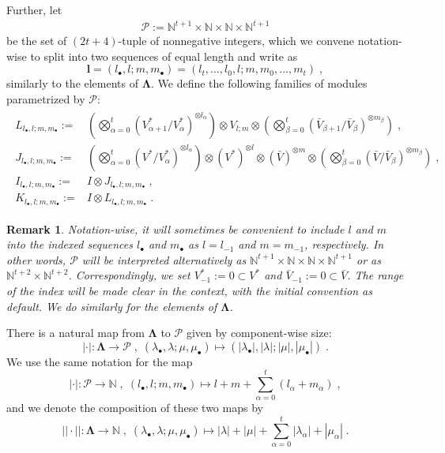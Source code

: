 \documentclass[12pt]{article}
\def\NN {{\mathbb N}}     %
\def\mc {\mathcal}
\newtheorem{rem}{Remark}[section]
\begin{document}
Further, let
\begin{gather}\label{For mcP}
\mc P := \NN^{t+1}\times \NN\times \NN\times\NN^{t+1}
\end{gather}
be the set of $(2t+4)$-tuple of nonnegative integers, which we convene notation-wise to split into two sequences of equal length and write as
$$
\bm l= (l_\bullet,l;m,m_\bullet)=(l_{t},...,l_0,l;m,m_0,...,m_{t}) \;,
$$
similarly to the elements of $\bm\Lambda$. We define the following families of modules parametrized by $\mc P$:
\begin{gather}\label{For LJITlm}
\begin{array}{rl}
L_{l_\bullet,l;m,m_\bullet} :=& \left(\bigotimes\limits_{\alpha=0}^t (V^*_{\alpha+1}/V^*_{\alpha})^{\otimes l_\alpha}\right)\otimes V_{l;m}\otimes \left(\bigotimes\limits_{\beta=0}^t (\bar V_{\beta+1}/\bar V_{\beta})^{\otimes m_\beta}\right)\;, \\
J_{l_\bullet,l;m,m_\bullet} := & \left(\bigotimes\limits_{\alpha=0}^t (V^*/V^*_{\alpha})^{\otimes l_\alpha}\right)\otimes (V^*)^{\otimes l} \otimes (\bar V)^{\otimes m} \otimes \left(\bigotimes\limits_{\beta=0}^t (\bar V/\bar V_{\beta})^{\otimes m_\beta}\right) \;,\\
I_{l_\bullet,l;m,m_\bullet} :=& I\otimes J_{l_\bullet,l;m,m_\bullet} \;,\\
K_{l_\bullet,l;m,m_\bullet} :=& I\otimes L_{l_\bullet,l;m,m_\bullet} \;.
\end{array}
\end{gather}

\begin{rem}\label{Rem index lm}
Notation-wise, it will sometimes be convenient to include $l$ and $m$ into the indexed sequences $l_\bullet$ and $m_\bullet$ as $l=l_{-1}$ and $m=m_{-1}$, respectively. In other words, $\mc P$ will be interpreted alternatively as $\NN^{t+1}\times\NN\times\NN\times \NN^{t+1}$ or as $\NN^{t+2}\times\NN^{t+2}$. Correspondingly, we set $V^*_{-1}:=0\subset V^*$ and $\bar V_{-1}:=0\subset \bar V$. The range of the index will be made clear in the context, with the initial convention as default. We do similarly for the elements of $\bm\Lambda$.
\end{rem}

There is a natural map from $\bm\Lambda$ to $\mc P$ given by component-wise size:
$$
|\cdot|:\bm\Lambda \to \mc P \;,\; (\lambda_\bullet,\lambda;\mu,\mu_\bullet)\mapsto (|\lambda_\bullet|,|\lambda|;|\mu|,|\mu_\bullet|) \;.
$$
We use the same notation for the map
$$
|\cdot|:\mc P \to \NN \;,\; (l_\bullet,l;m,m_\bullet)\mapsto l+m+\sum\limits_{\alpha=0}^t(l_\alpha+m_\alpha) \;,
$$
and we denote the composition of these two maps by
$$
||\cdot|| :\bm\Lambda\to \NN \;,\; (\lambda_\bullet,\lambda;\mu,\mu_\bullet) \mapsto |\lambda|+|\mu|+ \sum\limits_{\alpha=0}^t |\lambda_\alpha|+|\mu_\alpha| \;.
$$
\end{document}
